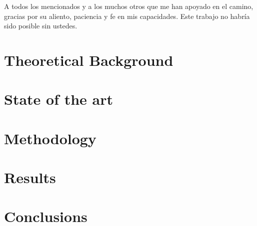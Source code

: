 \documentclass[oneside, 12pt, a4paper]{book}
\begin{document}
A todos los mencionados y a los muchos otros que me han apoyado en el camino, gracias por su aliento, paciencia y fe en mis capacidades. Este trabajo no habría sido posible sin ustedes.

\endgroup

\blankpage%

\renewcommand{\contentsname}{Table of Contents}
\tableofcontents

\blankpage%

\listoffigures

\blankpage%

\listoftables

\blankpage%

\printglossary[type=\acronymtype,style=long, title=LIST OF ACROYNMS]

\blankpage%

\mainmatter%








\part{Theoretical Background}\label{part:theoretical_background}





\part{State of the art}\label{part:state_of_the_art}





\part{Methodology}\label{part:methodology}





\part{Results}\label{part:results}




\part{Conclusions}\label{part:conclusions}






\blankpage%
\printbibliography%
\end{document}
